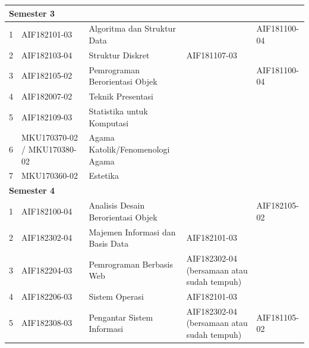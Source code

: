 \begin{table}[H]
\begin{tabular}{|p{0.5cm}|p{2.85cm}|p{4.95cm}|p{2.7cm}|p{2.7cm}|}
\multicolumn{5}{|l|}{\textbf{Semester 3}} \\ \hline
1 & AIF182101-03 & Algoritma dan Struktur Data &  & AIF181100-04 \\ \hline
2 & AIF182103-04 & Struktur Diskret & AIF181107-03 &  \\ \hline
3 & AIF182105-02 & Pemrograman Berorientasi Objek &  & AIF181100-04 \\ \hline
4 & AIF182007-02 & Teknik Presentasi &  &  \\ \hline
5 & AIF182109-03 & Statistika untuk Komputasi &  &  \\ \hline
6 & MKU170370-02 / MKU170380-02 & Agama Katolik/Fenomenologi Agama &  &  \\ \hline
7 & MKU170360-02 & Estetika &  &  \\ \hline
\multicolumn{5}{|l|}{\textbf{Semester 4}} \\ \hline
1 & AIF182100-04 & Analisis Desain Berorientasi Objek &  & AIF182105-02 \\ \hline
2 & AIF182302-04 & Majemen Informasi dan Basis Data & AIF182101-03 &  \\ \hline
3 & AIF182204-03 & Pemrograman Berbasis Web & AIF182302-04 (bersamaan atau sudah tempuh) &  \\ \hline
4 & AIF182206-03 & Sistem Operasi & AIF182101-03 &  \\ \hline
5 & AIF182308-03 & Pengantar Sistem Informasi & AIF182302-04 (bersamaan atau sudah tempuh) & AIF181105-02 \\ \hline
		\end{tabular}
	\label{tab:DaftarMataKuliahWajibDanPrasyaratnya}
\end{table}

